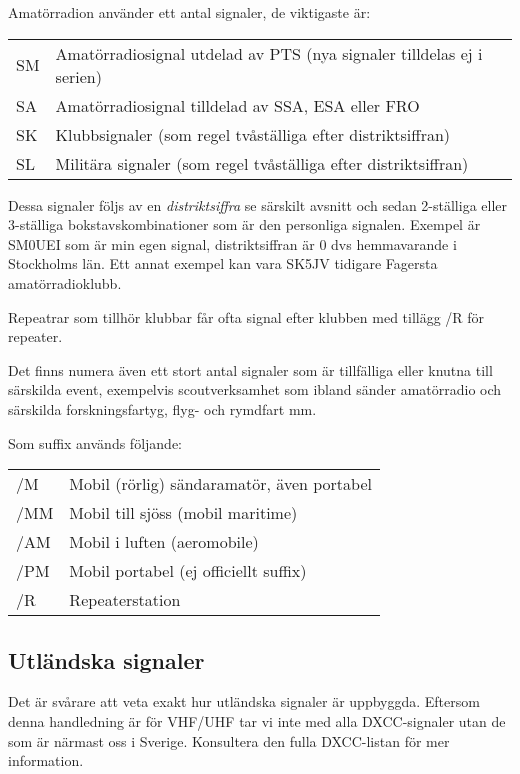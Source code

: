 Amatörradion använder ett antal signaler, de viktigaste är:

\begin{tabular}{ll}
	SM & Amatörradiosignal utdelad av PTS (nya signaler tilldelas ej i serien) \\
	SA & Amatörradiosignal tilldelad av SSA, ESA eller FRO                     \\
	SK & Klubbsignaler (som regel tvåställiga efter distriktsiffran)           \\
	SL & Militära signaler (som regel tvåställiga efter distriktsiffran)
\end{tabular}

Dessa signaler följs av en \textit{distriktsiffra} se särskilt avsnitt och sedan 2-ställiga eller 3-ställiga bokstavskombinationer som är den personliga signalen. Exempel är SM0UEI som är min egen signal, distriktsiffran är 0 dvs hemmavarande i Stockholms län. Ett annat exempel kan vara SK5JV tidigare Fagersta amatörradioklubb.

Repeatrar som tillhör klubbar får ofta signal efter klubben med tillägg /R för repeater.

Det finns numera även ett stort antal signaler som är tillfälliga eller knutna till särskilda event, exempelvis scoutverksamhet som ibland sänder amatörradio och särskilda forskningsfartyg, flyg- och rymdfart mm.

Som suffix används följande:

\begin{tabular}{ll}
	/M  & Mobil (rörlig) sändaramatör, även portabel \\
	/MM & Mobil till sjöss (mobil maritime)          \\
	/AM & Mobil i luften (aeromobile)                \\
	/PM & Mobil portabel (ej officiellt suffix)\\
	/R  & Repeaterstation
\end{tabular}

\subsection{Utländska signaler}

Det är svårare att veta exakt hur utländska signaler är uppbyggda. Eftersom denna handledning är för VHF/UHF tar vi inte med alla DXCC-signaler utan de som är närmast oss i Sverige. Konsultera den fulla DXCC-listan för mer information.

